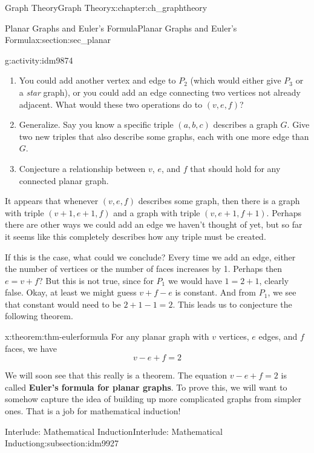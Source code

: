 \documentclass[oneside,10pt,]{book}
\newcommand{\terminology}[1]{\textbf{#1}}
\numberwithin{equation}{chapter}
\begin{document}
\begin{chapterptx}{Graph Theory}{}{Graph Theory}{}{}{x:chapter:ch_graphtheory}
\begin{sectionptx}{Planar Graphs and Euler's Formula}{}{Planar Graphs and Euler's Formula}{}{}{x:section:sec_planar}
\begin{introduction}{}
\begin{activity}{}{g:activity:idm9874}
\begin{enumerate}[font=\bfseries,label=(\alph*),ref=\alph*]
\item{}You could add another vertex and edge to \(P_2\) (which would either give \(P_3\) or a \emph{star} graph), or you could add an edge connecting two vertices not already adjacent.  What would these two operations do to \((v,e,f)\)?%
\item{}Generalize.  Say you know a specific triple \((a,b,c)\) describes a graph \(G\).  Give two new triples that also describe some graphs, each with one more edge than \(G\).%
\item{}Conjecture a relationship between \(v\), \(e\), and \(f\) that should hold for any connected planar graph.%
\end{enumerate}
\end{activity}
It appears that whenever \((v,e,f)\) describes some graph, then there is a graph with triple \((v+1, e+1, f)\) and a graph with triple \((v,e+1, f+1)\).  Perhaps there are other ways we could add an edge we haven't thought of yet, but so far it seems like this completely describes how any triple must be created.%
\par
If this is the case, what could we conclude?  Every time we add an edge, either the number of vertices or the number of faces increases by 1.  Perhaps then \(e = v + f\)?  But this is not true, since for \(P_1\) we would have \(1 = 2 + 1\), clearly false.  Okay, at least we might guess \(v + f - e\) is constant.  And from \(P_1\), we see that constant would need to be \(2 + 1 - 1 = 2\).  This leads us to conjecture the following theorem.%
\begin{theorem}{}{}{x:theorem:thm-eulerformula}%
For any planar graph with \(v\) vertices, \(e\) edges, and \(f\) faces, we have%
\begin{equation*}
v - e + f = 2
\end{equation*}
%
\end{theorem}
We will soon see that this really is a theorem.  The equation \(v-e+f = 2\) is called \terminology{Euler's formula for planar graphs}.  To prove this, we will want to somehow capture the idea of building up more complicated graphs from simpler ones.  That is a job for mathematical induction!%
\end{introduction}%
%
%
\typeout{************************************************}
\typeout{************************************************}
%
\begin{subsectionptx}{Interlude: Mathematical Induction}{}{Interlude: Mathematical Induction}{}{}{g:subsection:idm9927}

\end{subsectionptx}
\end{sectionptx}
\end{chapterptx}
\end{document}
